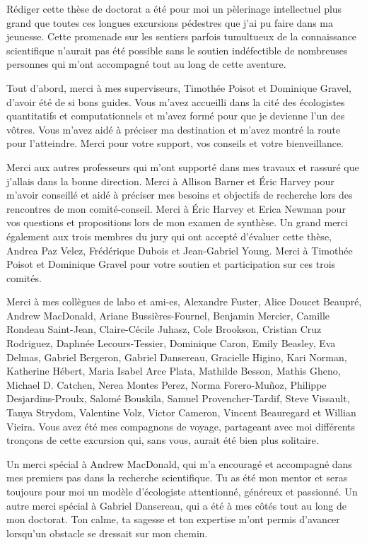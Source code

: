 \documentclass[12pt,twoside,phd]{dms}
\numberwithin{equation}{section}
\numberwithin{table}{chapter}
\numberwithin{figure}{chapter}
\begin{document}
Rédiger cette thèse de doctorat a été pour moi un pèlerinage intellectuel plus
grand que toutes ces longues excursions pédestres que j'ai pu faire dans ma
jeunesse. Cette promenade sur les sentiers parfois tumultueux de la connaissance
scientifique n'aurait pas été possible sans le soutien indéfectible de
nombreuses personnes qui m'ont accompagné tout au long de cette aventure.

Tout d'abord, merci à mes superviseurs, Timothée Poisot et Dominique Gravel,
d'avoir été de si bons guides. Vous m'avez accueilli dans la cité des
écologistes quantitatifs et computationnels et m'avez formé pour que je devienne
l'un des vôtres. Vous m'avez aidé à préciser ma destination et m'avez
montré la route pour l'atteindre. Merci pour votre support, vos conseils et
votre bienveillance.

Merci aux autres professeurs qui m'ont supporté dans mes travaux et rassuré que
j'allais dans la bonne direction. Merci à Allison Barner et Éric Harvey pour
m'avoir conseillé et aidé à préciser mes besoins et objectifs de recherche lors
des rencontres de mon comité-conseil. Merci à Éric Harvey et Erica Newman pour
vos questions et propositions lors de mon examen de synthèse. Un grand merci
également aux trois membres du jury qui ont accepté d'évaluer cette thèse,
Andrea Paz Velez, Frédérique Dubois et Jean-Gabriel Young. Merci à Timothée
Poisot et Dominique Gravel pour votre soutien et participation sur ces trois
comités.

Merci à mes collègues de labo et ami-es, Alexandre Fuster, Alice Doucet Beaupré,
Andrew MacDonald, Ariane Bussières-Fournel, Benjamin Mercier, Camille Rondeau Saint-Jean, Claire-Cécile
Juhasz, Cole Brookson, Cristian Cruz Rodriguez, Daphnée Lecours-Tessier,
Dominique Caron, Emily Beasley, Eva Delmas, Gabriel Bergeron, Gabriel Dansereau,
Gracielle Higino, Kari Norman, Katherine Hébert, Maria Isabel Arce Plata,
Mathilde Besson, Mathis Gheno, Michael D. Catchen, Nerea Montes Perez, Norma
Forero-Muñoz, Philippe Desjardins-Proulx, Salomé Bouskila, Samuel
Provencher-Tardif, Steve Vissault, Tanya Strydom, Valentine Volz, Victor
Cameron, Vincent Beauregard et Willian Vieira. Vous avez été mes compagnons de
voyage, partageant avec moi différents tronçons de cette excursion qui, sans
vous, aurait été bien plus solitaire. 

Un merci spécial à Andrew MacDonald, qui m'a encouragé et accompagné dans mes
premiers pas dans la recherche scientifique. Tu as été mon mentor et seras
toujours pour moi un modèle d'écologiste attentionné, généreux et passionné.
Un autre merci spécial à Gabriel Dansereau, qui a été à mes côtés tout au
long de mon doctorat. Ton calme, ta sagesse et ton expertise m'ont permis
d'avancer lorsqu'un obstacle se dressait sur mon chemin.
\end{document}
